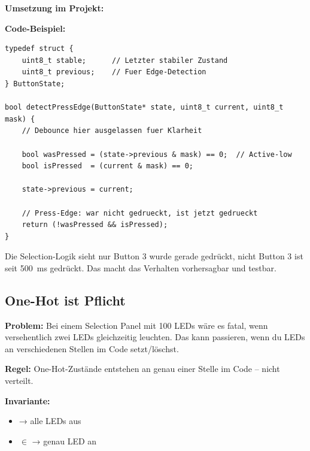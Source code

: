 \textbf{Umsetzung im Projekt:}

\begin{center}
\end{center}

\textbf{Code-Beispiel:}

\begin{lstlisting}[style=arduino]
typedef struct {
    uint8_t stable;      // Letzter stabiler Zustand
    uint8_t previous;    // Fuer Edge-Detection
} ButtonState;

bool detectPressEdge(ButtonState* state, uint8_t current, uint8_t mask) {
    // Debounce hier ausgelassen fuer Klarheit

    bool wasPressed = (state->previous & mask) == 0;  // Active-low
    bool isPressed  = (current & mask) == 0;

    state->previous = current;

    // Press-Edge: war nicht gedrueckt, ist jetzt gedrueckt
    return (!wasPressed && isPressed);
}
\end{lstlisting}

\begin{tipbox}[Konsequenz]
Die Selection-Logik sieht nur \glqq Button 3 wurde gerade gedrückt\grqq, nicht \glqq Button 3 ist seit \SI{500}{\milli\second} gedrückt\grqq. Das macht das Verhalten vorhersagbar und testbar.
\end{tipbox}

\subsection{One-Hot ist Pflicht}

\textbf{Problem:} Bei einem Selection Panel mit 100 LEDs wäre es fatal, wenn versehentlich zwei LEDs gleichzeitig leuchten. Das kann passieren, wenn du LEDs an verschiedenen Stellen im Code setzt/löschst.

\textbf{Regel:} One-Hot-Zustände entstehen an genau einer Stelle im Code – nicht verteilt.

\textbf{Invariante:}

\begin{itemize}
\item {} → alle LEDs aus
\item {} $\in$ \code{[1..N]} → genau LED  an
\end{itemize}

